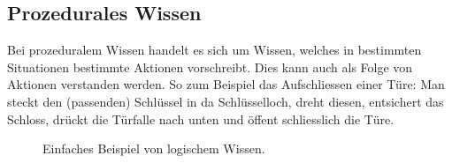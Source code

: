 \subsection{Prozedurales Wissen}
\label{subsec:prozedurales_wissen}
Bei prozeduralem Wissen handelt es sich um Wissen, welches in bestimmten Situationen bestimmte Aktionen vorschreibt. Dies kann auch als Folge von Aktionen verstanden werden. So zum Beispiel das Aufschliessen einer Türe: Man steckt den (passenden) Schlüssel in da Schlüsselloch, dreht diesen, entsichert das Schloss, drückt die Türfalle nach unten und öffent schliesslich die Türe.

\begin{figure}[htbp]
\centering {}
\caption{Einfaches Beispiel von logischem Wissen.\label{fig:experten_systeme_prozedurales_wissen}\protect\footnotemark}
\end{figure}

\newpage

